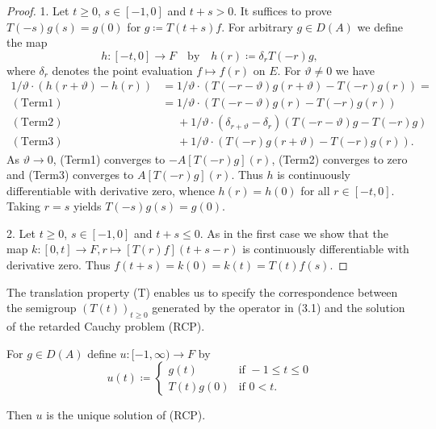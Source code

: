 \begin{proof}
1. Let $t \geq 0$, $s \in [-1,0]$ and $t+s  >  0$.
It suffices to prove $T(-s)g(s) = g(0)$ for $g  \coloneq  T(t+s)f$.
For arbitrary $g \in D(A)$ we define the map
\[h : [-t,0] \to F \quad \text{by} \quad h(r) \coloneq  \delta_{r}T(-r)g,\]
where $\delta_{r}$ denotes the point evaluation $f \mapsto f(r)$ on $E$.
For $\vartheta \neq 0$ we have
%
\begin{align*}
	1/\vartheta\cdot(h(r+\vartheta) - h(r)) & = 1/\vartheta\cdot(T(-r-\vartheta)g(r+\vartheta) - T(-r)g(r)) =\\
	(\mathrm{Term1})\quad  &= 1/\vartheta\cdot(T(-r-\vartheta)g(r) - T(-r)g(r)) \\
	(\mathrm{Term2})\quad  &\phantom{= }  + 1/\vartheta\cdot(\delta_{r+\vartheta} - \delta_{r})(T(-r-\vartheta)g - T(-r)g) \\
	(\mathrm{Term3})\quad &\phantom{= }  + 1/\vartheta\cdot(T(-r)g(r+\vartheta) - T(-r)g(r)).
\end{align*}
As $\vartheta \to 0$, (Term1) converges to $-A[T(-r)g](r)$, (Term2) converges to zero and (Term3) converges to $A[T(-r)g](r)$.
Thus $h$ is continuously differentiable with derivative zero, whence $h(r) = h(0)$ for all $r \in [-t,0]$.
Taking $r = s$ yields $T(-s)g(s) = g(0)$.

2. Let $t \geq 0$, $s \in [-1,0]$ and $t+s \leq 0$.
As in the first case we show that the map $k : [0,t] \to F , r \mapsto [T(r)f](t+s-r)$ is continuously differentiable with derivative zero.
Thus $f(t+s) = k(0) = k(t) = T(t)f(s)$.
\end{proof}

The translation property (T) enables us to specify the correspondence between the semigroup $(T(t))_{t\geq 0}$ generated by the operator in (3.1) and the solution of the retarded Cauchy problem (RCP).
\begin{corollary}\label{cor:b4-3.2}
	For $g \in D(A)$ define $u : [-1,\infty) \to F$ by
	\[u(t)  \coloneq  \begin{cases}
		g(t) & \text{if } -1 \leq t \leq 0 \\
		T(t)g(0) & \text{if } 0 < t.
	\end{cases}\]
	
	Then $u$ is the unique solution of (RCP).
\end{corollary}

